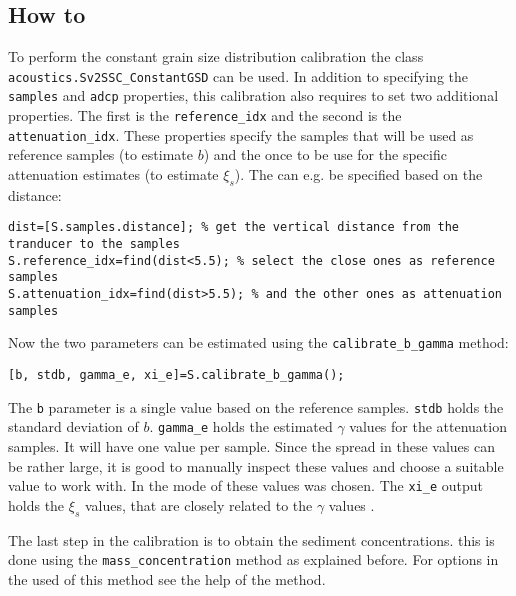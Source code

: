 \documentclass[]{article}
\begin{document}
\subsection{How to}
To perform the constant grain size distribution calibration the class \lstinline!acoustics.Sv2SSC_ConstantGSD! can be used. In addition to specifying the \lstinline!samples! and \lstinline!adcp! properties, this calibration also requires to set two additional properties. The first is the \lstinline!reference_idx! and the second is the \lstinline!attenuation_idx!. These properties specify the samples that will be used as reference samples (to estimate $b$) and the once to be use for the specific attenuation estimates (to estimate $\xi_s$). The can e.g. be specified based on the distance:
\begin{lstlisting}
dist=[S.samples.distance]; % get the vertical distance from the tranducer to the samples
S.reference_idx=find(dist<5.5); % select the close ones as reference samples
S.attenuation_idx=find(dist>5.5); % and the other ones as attenuation samples
\end{lstlisting}
Now the two parameters can be estimated using the \lstinline!calibrate_b_gamma! method:
\begin{lstlisting}
[b, stdb, gamma_e, xi_e]=S.calibrate_b_gamma();
\end{lstlisting}
The \lstinline!b! parameter is a single value based on the reference samples. \lstinline!stdb! holds the standard deviation of $b$. \lstinline!gamma_e! holds the estimated $\gamma$ values for the attenuation samples. It will have one value per sample. Since the spread in these values can be rather large, it is good to manually inspect these values and choose a suitable value to work with. In \citet{sassi2012} the mode of these values was chosen. The \lstinline!xi_e! output holds the $\xi_s$ values, that are closely related to the $\gamma$ values \citep[see equation 12, ][]{sassi2012}. 

The last step in the calibration is to obtain the sediment concentrations. this is done using the \lstinline!mass_concentration! method as explained before. For options in the used of this method see the help of the method.
\end{document}
